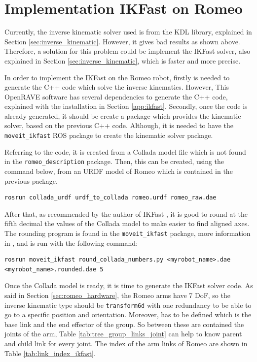 \documentclass[12pt,a4paper,final,twoside,openright]{report}
\begin{document}
\section{Implementation IKFast on Romeo}
\label{sec:exp_ikfast}

Currently, the inverse kinematic solver used is from the KDL library, explained in Section \ref{sec:inverse_kinematic}. However, it gives bad results as shown above. Therefore, a solution for this problem could be implement the IKFast solver, also explained in Section \ref{sec:inverse_kinematic}, which is faster and more precise. 

In order to implement the IKFast on the Romeo robot, firstly is needed to generate the C++ code which solve the inverse kinematics. However, This OpenRAVE software has several dependencies to generate the C++ code, explained with the installation in Section \ref{app:ikfast}. Secondly, once the code is already generated, it should be create a package which provides the kinematic solver, based on the previous C++ code. Although, it is needed to have the \texttt{moveit\_ikfast} ROS package to create the kinematic solver package. 

Referring to the code, it is created from a Collada model file which is not found in the \texttt{romeo\_description} package. Then, this can be created, using the command below, from an URDF model of Romeo which is contained in the previous package.

\begin{lstlisting}[language=ROS]
rosrun collada_urdf urdf_to_collada romeo.urdf romeo_raw.dae
\end{lstlisting}

After that, as recommended by the author of IKFast  \cite{Diankov2010}, it is good to round at the fifth decimal the values of the Collada model to make easier to find aligned axes. The rounding program is found in the \texttt{moveit\_ikfast} package, more information in \cite{MoveIt2013}, and is run with the following command:

\begin{lstlisting}[language=ROS]
rosrun moveit_ikfast round_collada_numbers.py <myrobot_name>.dae <myrobot_name>.rounded.dae 5
\end{lstlisting}

Once the Collada model is ready, it is time to generate the IKFast solver code. As said in Section \ref{sec:romeo_hardware}, the Romeo arms have 7 DoF, so the inverse kinematic type should be \texttt{transform6d} with one redundancy to be able to go to a specific position and orientation. Moreover, has to be defined which is the base link and the end effector of the group. So between these are contained the joints of the arm, Table \ref{tab:tree_group_links_joint} can help to know parent and child link for every joint. The index of the arm links of Romeo are shown in Table \ref{tab:link_index_ikfast}. 
\end{document}
